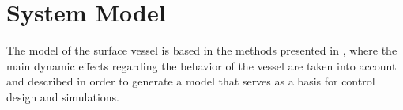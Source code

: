 \chapter{System Model} \label{chap:model}
The model of the surface vessel is based in the methods presented in \cite{TFossen}, where the main dynamic effects regarding the behavior of the vessel are taken into account and  described in order to generate a model that serves as a basis for control design and simulations.

